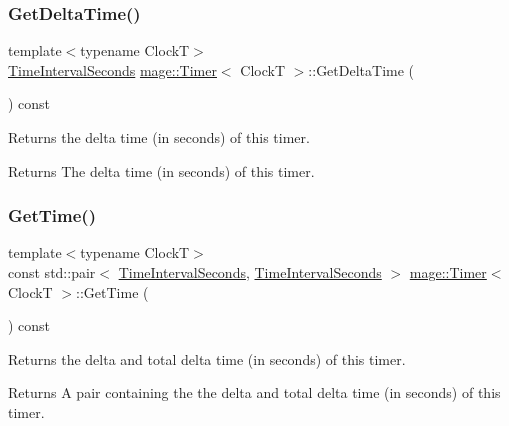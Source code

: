 \subsubsection{\texorpdfstring{Get\+Delta\+Time()}{GetDeltaTime()}}
{\footnotesize\ttfamily template$<$typename ClockT$>$ \\
\mbox{\hyperlink{namespacemage_a21c3d1575018d1e0720948713c76be1f}{Time\+Interval\+Seconds}} \mbox{\hyperlink{classmage_1_1_timer}{mage\+::\+Timer}}$<$ ClockT $>$\+::Get\+Delta\+Time (\begin{DoxyParamCaption}{ }\end{DoxyParamCaption}) const\hspace{0.3cm}{\ttfamily [noexcept]}}

Returns the delta time (in seconds) of this timer.

\begin{DoxyReturn}{Returns}
The delta time (in seconds) of this timer. 
\end{DoxyReturn}
\mbox{\label{classmage_1_1_timer_a7e04c39e6baaf9dcebe4eea1708cfd55}} 
\subsubsection{\texorpdfstring{Get\+Time()}{GetTime()}}
{\footnotesize\ttfamily template$<$typename ClockT$>$ \\
const std\+::pair$<$ \mbox{\hyperlink{namespacemage_a21c3d1575018d1e0720948713c76be1f}{Time\+Interval\+Seconds}}, \mbox{\hyperlink{namespacemage_a21c3d1575018d1e0720948713c76be1f}{Time\+Interval\+Seconds}} $>$ \mbox{\hyperlink{classmage_1_1_timer}{mage\+::\+Timer}}$<$ ClockT $>$\+::Get\+Time (\begin{DoxyParamCaption}{ }\end{DoxyParamCaption}) const\hspace{0.3cm}{\ttfamily [noexcept]}}

Returns the delta and total delta time (in seconds) of this timer.

\begin{DoxyReturn}{Returns}
A pair containing the the delta and total delta time (in seconds) of this timer. 
\end{DoxyReturn}
\mbox{\label{classmage_1_1_timer_aece10085e326df9110d9f84d74fd2558}} 
